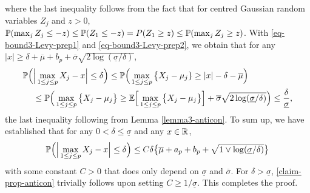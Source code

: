 where the last inequality follows from the fact that for centred Gaussian random variables $Z_j$ and $z > 0$, $\mathbb{P}(\max_j Z_j \le - z) \le \mathbb{P}(Z_1 \le -z) = P(Z_1 \ge z) \le \mathbb{P}(\max_j Z_j \ge z)$. With \eqref{eq-bound3-Levy-prep1} and \eqref{eq-bound3-Levy-prep2}, we obtain that for any $|x| \ge \delta + \overline{\mu} + b_p + \overline{\sigma}\sqrt{2\log(\underline{\sigma}/\delta)}$,
\begin{align*} 
\mathbb{P} \Big( & \Big| \max_{1 \le j \le p} X_j - x \Big| \le \delta \Big) \le \mathbb{P} \Big( \max_{1 \le j \le p} \big\{ X_j - \mu_j \} \ge |x| - \delta - \overline{\mu} \Big) \\
 & \le \mathbb{P} \Big( \max_{1 \le j \le p} \big\{ X_j - \mu_j \big\} \ge \mathbb{E} \Big[ \max_{1 \le j \le p} \big\{ X_j-\mu_j \big\} \Big] + \overline{\sigma} \sqrt{2\log(\underline{\sigma}/\delta)} \Big) \le \frac{\delta}{\underline{\sigma}}, 
\end{align*}
the last inequality following from Lemma \ref{lemma3-anticon}. To sum up, we have established that for any $0 < \delta \le \underline{\sigma}$ and any $x \in \mathbb{R}$, 
\begin{equation}\label{claim-prop-anticon}
\mathbb{P} \Big( \Big| \max_{1 \le j \le p} X_j - x \Big| \le \delta \Big) \le C \delta \big\{ \overline{\mu} + a_p + b_p + \sqrt{1 \vee \log(\underline{\sigma}/\delta)} \big\} 
\end{equation}
with some constant $C > 0$ that does only depend on $\underline{\sigma}$ and $\overline{\sigma}$. For $\delta > \underline{\sigma}$, \eqref{claim-prop-anticon} trivially follows upon setting $C \ge 1/\underline{\sigma}$. This completes the proof. 

